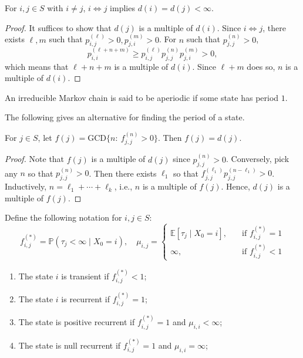 \begin{proposition}
For $i,j\in S$ with $i\ne j$, $i\Leftrightarrow j$ implies $d(i)=d(j)<\infty$.
\end{proposition}
\begin{proof}
It suffices to show that $d(j)$ is a multiple of $d(i)$.
Since $i\Leftrightarrow j$, there exists $\ell, m$ such that 
$p_{i,j}^{(\ell)}>0, p_{j,i}^{(m)}>0$.
For $n$ such that $p_{j,j}^{(n)}>0$,
\[
p_{i,i}^{(\ell+n+m)}\ge p_{i,j}^{(\ell)}p_{j,j}^{(n)}p_{j,i}^{(m)}>0,
\]
which means that $\ell+n+m$ is a multiple of $d(i)$.
Since $\ell+m$ does so, $n$ is a multiple of $d(i)$.
\end{proof}

\begin{definition}[Aperiodic]
An irreducible Markov chain is said to be aperiodic if some state has period $1$.
\end{definition}
The following gives an alternative for finding the period of a state.
\begin{proposition}
For $j\in S$, let $f(j)=\text{GCD}\{n:~f_{j,j}^{(n)}>0\}$.
Then $f(j)=d(j)$.
\end{proposition}
\begin{proof}
Note that $f(j)$ is a multiple of $d(j)$ since $p_{j,j}^{(n)}>0$.
Conversely, pick any $n$ so that $p_{j,j}^{(n)}>0$.
Then there exists $\ell_1$ so that $f_{j,j}^{(\ell_1)}p_{j,j}^{(n-\ell_1)}>0$.
Inductively, $n=\ell_1+\cdots+\ell_k$, i.e., $n$ is a multiple of $f(j)$.
Hence, $d(j)$ is a multiple of $f(j)$.
\end{proof}

\begin{definition}
Define the following notation for $i,j\in S$:
\[
f_{i,j}^{(*)}=\mathbb{P}(\tau_j<\infty\mid X_0=i),\quad
\mu_{i,j}=\left\{
\begin{aligned}
\mathbb{E}[\tau_j\mid X_0=i],&\quad\text{if $f_{i,j}^{(*)}=1$}\\
\infty,&\quad\text{if $f_{i,j}^{(*)}<1$}
\end{aligned}
\right.
\]
\begin{enumerate}
\item
The state $i$ is transient if $f_{i,j}^{(*)}<1$;
\item
The state $i$ is recurrent if $f_{i,j}^{(*)}=1$;
\item
The state is positive recurrent if $f_{i,j}^{(*)}=1$ and $\mu_{i,i}<\infty$;
\item
The state is null recurrent if $f_{i,j}^{(*)}=1$ and $\mu_{i,i}=\infty$;
\end{enumerate}
\end{definition}

